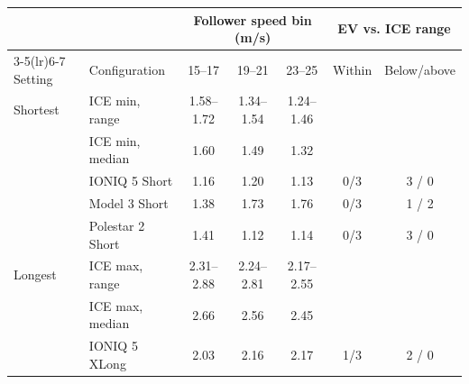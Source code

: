 \begin{tabular}{llccccc}
\toprule
 & & \multicolumn{3}{c}{Follower speed bin (m/s)} & \multicolumn{2}{c}{EV vs. ICE range} \\
\cmidrule(lr){3-5}\cmidrule(lr){6-7}
Setting & Configuration & 15--17 & 19--21 & 23--25 & Within & Below/above \\
\midrule
Shortest & ICE min, range & 1.58--1.72 & 1.34--1.54 & 1.24--1.46 &  &  \\
 & ICE min, median & 1.60 & 1.49 & 1.32 &  &  \\
 & IONIQ 5 Short & 1.16 & 1.20 & 1.13 & 0/3 & 3 / 0 \\
 & Model 3 Short & 1.38 & 1.73 & 1.76 & 0/3 & 1 / 2 \\
 & Polestar 2 Short & 1.41 & 1.12 & 1.14 & 0/3 & 3 / 0 \\
\midrule
Longest & ICE max, range & 2.31--2.88 & 2.24--2.81 & 2.17--2.55 &  &  \\
 & ICE max, median & 2.66 & 2.56 & 2.45 &  &  \\
 & IONIQ 5 XLong & 2.03 & 2.16 & 2.17 & 1/3 & 2 / 0 \\
\bottomrule
\end{tabular}
